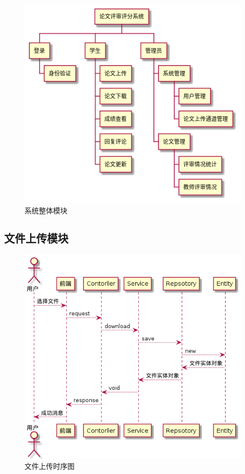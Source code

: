 \begin{figure}[htbp]
    \centering
    \includegraphics[scale = 0.6]{out/uml/WBS/系统WBS/系统WBS.png}
    \caption{\song\wuhao 系统整体模块}
    \label{system-wbs}
\end{figure}

\subsection{文件上传模块}

\begin{figure}[htbp]
    \centering
    \includegraphics[scale = 0.6]{out/uml/时序图/file-upload-sequence/file-upload-sequence.png}
    \caption{\song\wuhao 文件上传时序图}
    \label{file-upload-sequence}
\end{figure}

